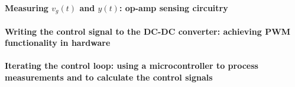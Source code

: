 \paragraph{Measuring $v_g(t)$ and $y(t)$: op-amp sensing circuitry}
\paragraph{Writing the control signal to the DC-DC converter: achieving PWM functionality in hardware}
\paragraph{Iterating the control loop: using a microcontroller to process measurements and to calculate the control signals}
